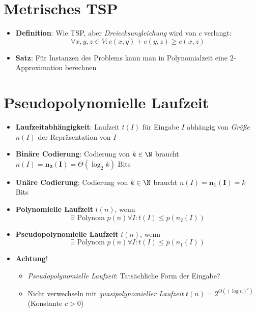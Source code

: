 \section{Metrisches TSP}

\begin{itemize}
  \item \textbf{Definition}: Wie TSP, aber \emph{Dreiecksungleichung} wird von $ c $ verlangt:
  \begin{equation*}
    \forall x, y, z \in V : c(x,y) + c(y,z) \geq c(x,z)
  \end{equation*}
  \item \textbf{Satz}: Für Instanzen des Problems kann man in Polynomialzeit eine $ 2 $-Approximation berechnen
\end{itemize}

\section{Pseudopolynomielle Laufzeit}

\begin{itemize}
  \item \textbf{Laufzeitabhängigkeit}: Laufzeit $ t(I) $ für Eingabe $ I $ abhängig von \emph{Größe} $ n(I) $ der Repräsentation von $ I $
  \item \textbf{Binäre Codierung}: Codierung von $ k \in \N $ braucht $ n(I) = \bm{n_2(I)} = \Theta(\log_2 k) $ Bits
  \item \textbf{Unäre Codierung}: Codierung von $ k \in \N $ braucht $ n(I) = \bm{n_1(I)} = k $ Bits
  \item \textbf{Polynomielle Laufzeit} $ t(n) $, wenn
    \begin{equation*}
      \exists \text{ Polynom } p(n) \forall I : t(I) \leq p(n_2(I))
    \end{equation*}
  \item \textbf{Pseudopolynomielle Laufzeit} $ t(n) $, wenn
    \begin{equation*}
      \exists \text{ Polynom } p(n) \forall I : t(I) \leq p(n_1(I))
    \end{equation*}
  \item \textbf{Achtung}!
  \begin{itemize}
    \item \emph{Pseudopolynomielle Laufzeit}: Tatsächliche Form der Eingabe? 
    \item Nicht verwechseln mit \emph{quasipolynomieller Laufzeit} $ t(n) = 2^{O((\log n)^c)} $ (Konstante $ c > 0 $)
  \end{itemize}
\end{itemize}

